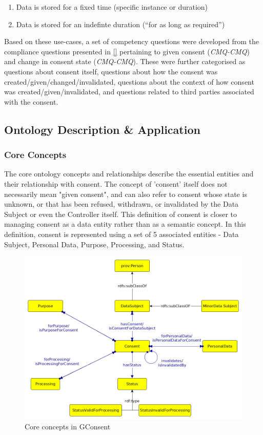 \begin{enumerate}
  \begin{enumerate}
  \item
    Data is stored for a fixed time (specific instance or duration)
  \item
    Data is stored for an indefinte duration (``for as long as
    required'')
  \end{enumerate}
\end{enumerate}
Based on these use-cases, a set of competency questions were developed from the compliance questions presented in \autoref{} pertaining to given consent (\textit{CMQ-CMQ}) and change in consent state (\textit{CMQ-CMQ}).
These were further categorised as questions about consent itself, questions about how the consent was created/given/changed/invalidated, questions about the context of how consent was created/given/invalidated, and questions related to third parties associated with the consent.

\subsection{Ontology Description \& Application}
\subsubsection{Core Concepts}
The core ontology concepts and relationships describe the essential entities and their relationship with consent. The concept of 'consent' itself does not necessarily mean "given consent", and can also refer to consent whose state is unknown, or that has been refused, withdrawn, or invalidated by the Data Subject or even the Controller itself. This definition of consent is closer to managing consent as a data entity rather than as a semantic concept. In this definition, consent is represented using a set of 5 associated entities - Data Subject, Personal Data, Purpose, Processing, and Status.
\begin{figure}[htbp]
    \centering
    \includegraphics[width=0.8\linewidth]{img/gconsent_core.png}
    \caption{Core concepts in GConsent \cite{}}
    \label{fig:vocabs:gconsent-core}
\end{figure}

